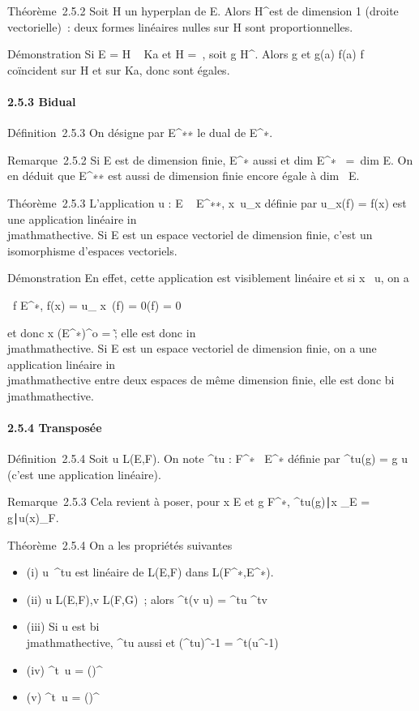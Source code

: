 \documentclass[]{article}
\begin{document}
Théorème~2.5.2 Soit H un hyperplan de E. Alors H^\bot est de
dimension 1 (droite vectorielle)~: deux formes linéaires nulles sur H
sont proportionnelles.

Démonstration Si E = H \oplus~ Ka et H =\
\mathrmKerf, soit g \in H^\bot. Alors g et 
g(a) \over f(a) f coïncident sur H et sur Ka, donc sont
égales.

\paragraph{2.5.3 Bidual}

Définition~2.5.3 On désigne par E^∗∗ le dual de
E^∗.

Remarque~2.5.2 Si E est de dimension finie, E^∗ aussi et
dim E^∗~ =\
dim E. On en déduit que E^∗∗ est aussi de dimension finie
encore égale à dim~ E.

Théorème~2.5.3 L'application u : E \rightarrow~ E^∗∗,
x\mapsto~u_x définie par u_x(f) =
f(x) est une application linéaire in\\jmathmathective. Si E est un espace
vectoriel de dimension finie, c'est un isomorphisme d'espaces
vectoriels.

Démonstration En effet, cette application est visiblement linéaire et si
x \in\mathrmKer~u, on a

\forall~f \in E^∗, f(x) = u_ x~(f) =
0(f) = 0

et donc x \in (E^∗)^o =
\0\~; elle est donc in\\jmathmathective. Si E
est un espace vectoriel de dimension finie, on a une application
linéaire in\\jmathmathective entre deux espaces de même dimension finie, elle est
donc bi\\jmathmathective.

\paragraph{2.5.4 Transposée}

Définition~2.5.4 Soit u \in L(E,F). On note ^tu :
F^∗\rightarrow~ E^∗ définie par ^tu(g) = g \cdot u
(c'est une application linéaire).

Remarque~2.5.3 Cela revient à poser, pour x \in E et g \in F^∗,
\langle
^tu(g)∣x\rangle
_E =\langle
g∣u(x)\rangle _F.

Théorème~2.5.4 On a les propriétés suivantes

\begin{itemize}
\itemsep1pt\parskip0pt
\item
  (i) u\mapsto~^tu est linéaire de L(E,F)
  dans L(F^∗,E^∗).
\item
  (ii) u \in L(E,F),v \in L(F,G)~; alors ^t(v \cdot u) =
  ^tu \cdot^tv
\item
  (iii) Si u est bi\\jmathmathective, ^tu aussi et
  (^tu)^-1 = ^t(u^-1)
\item
  (iv)
  \mathrmKer^t~u
  =
  (\mathrmImu)^\bot~
\item
  (v)
  \mathrmIm^t~u =
  (\mathrmKeru)^\bot~
\end{itemize}
\end{document}
